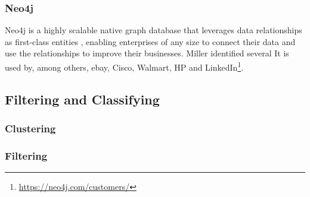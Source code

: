 \subsubsection{Neo4j}
Neo4j is a highly scalable native graph database that leverages data relationships as first-class entities \cite{neo4j}, enabling enterprises of any size to connect their data and use the relationships to improve their businesses. Miller identified several It is used by, among others, ebay, Cisco, Walmart, HP and LinkedIn\footnote{\url{https://neo4j.com/customers/}}.

\subsection{Filtering and Classifying}

\subsubsection{Clustering}
\subsubsection{Filtering}

